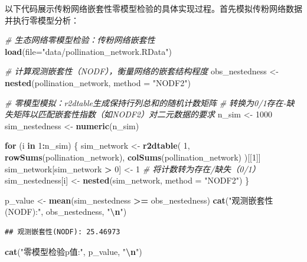 \documentclass[
  twoside,12pt,fontset=none]{ctexbook}
\newenvironment{Shaded}{\begin{snugshade}}{\end{snugshade}}
\newcommand{\AttributeTok}[1]{\textcolor[rgb]{0.13,0.29,0.53}{#1}}
\newcommand{\CommentTok}[1]{\textcolor[rgb]{0.56,0.35,0.01}{\textit{#1}}}
\newcommand{\ControlFlowTok}[1]{\textcolor[rgb]{0.13,0.29,0.53}{\textbf{#1}}}
\newcommand{\DecValTok}[1]{\textcolor[rgb]{0.00,0.00,0.81}{#1}}
\newcommand{\FunctionTok}[1]{\textcolor[rgb]{0.13,0.29,0.53}{\textbf{#1}}}
\newcommand{\NormalTok}[1]{#1}
\newcommand{\OtherTok}[1]{\textcolor[rgb]{0.56,0.35,0.01}{#1}}
\newcommand{\SpecialCharTok}[1]{\textcolor[rgb]{0.81,0.36,0.00}{\textbf{#1}}}
\newcommand{\StringTok}[1]{\textcolor[rgb]{0.31,0.60,0.02}{#1}}
\begin{document}
以下代码展示传粉网络嵌套性零模型检验的具体实现过程。首先模拟传粉网络数据并执行零模型分析：

\begin{Shaded}
\begin{Highlighting}[]
\CommentTok{\# 生态网络零模型检验：传粉网络嵌套性}
\FunctionTok{load}\NormalTok{(}\AttributeTok{file=}\StringTok{"data/pollination\_network.RData"}\NormalTok{)}

\CommentTok{\# 计算观测嵌套性（NODF），衡量网络的嵌套结构程度}
\NormalTok{obs\_nestedness }\OtherTok{\textless{}{-}} \FunctionTok{nested}\NormalTok{(pollination\_network, }\AttributeTok{method =} \StringTok{"NODF2"}\NormalTok{)}

\CommentTok{\# 零模型模拟：r2dtable生成保持行列总和的随机计数矩阵}
\CommentTok{\# 转换为0/1存在{-}缺失矩阵以匹配嵌套性指数（如NODF2）对二元数据的要求}
\NormalTok{n\_sim }\OtherTok{\textless{}{-}} \DecValTok{1000}
\NormalTok{sim\_nestedness }\OtherTok{\textless{}{-}} \FunctionTok{numeric}\NormalTok{(n\_sim)}

\ControlFlowTok{for}\NormalTok{ (i }\ControlFlowTok{in} \DecValTok{1}\SpecialCharTok{:}\NormalTok{n\_sim) \{}
\NormalTok{  sim\_network }\OtherTok{\textless{}{-}} \FunctionTok{r2dtable}\NormalTok{(}
    \DecValTok{1}\NormalTok{, }\FunctionTok{rowSums}\NormalTok{(pollination\_network),}
    \FunctionTok{colSums}\NormalTok{(pollination\_network)}
\NormalTok{  )[[}\DecValTok{1}\NormalTok{]]}
\NormalTok{  sim\_network[sim\_network }\SpecialCharTok{\textgreater{}} \DecValTok{0}\NormalTok{] }\OtherTok{\textless{}{-}} \DecValTok{1}   \CommentTok{\# 将计数转为存在/缺失（0/1）}
\NormalTok{  sim\_nestedness[i] }\OtherTok{\textless{}{-}} \FunctionTok{nested}\NormalTok{(sim\_network, }\AttributeTok{method =} \StringTok{"NODF2"}\NormalTok{)}
\NormalTok{\}}

\NormalTok{p\_value }\OtherTok{\textless{}{-}} \FunctionTok{mean}\NormalTok{(sim\_nestedness }\SpecialCharTok{\textgreater{}=}\NormalTok{ obs\_nestedness)}
\FunctionTok{cat}\NormalTok{(}\StringTok{"观测嵌套性(NODF):"}\NormalTok{, obs\_nestedness, }\StringTok{"}\SpecialCharTok{\textbackslash{}n}\StringTok{"}\NormalTok{)}
\end{Highlighting}
\end{Shaded}

\begin{verbatim}
## 观测嵌套性(NODF): 25.46973
\end{verbatim}

\begin{Shaded}
\begin{Highlighting}[]
\FunctionTok{cat}\NormalTok{(}\StringTok{"零模型检验p值:"}\NormalTok{, p\_value, }\StringTok{"}\SpecialCharTok{\textbackslash{}n}\StringTok{"}\NormalTok{)}
\end{Highlighting}
\end{Shaded}
\end{document}
